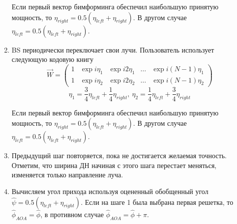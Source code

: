 \begin{enumerate}[label=\textbf{Шаг \arabic*:}]
          Если первый вектор бимформинга обеспечил наибольшую принятую мощность, то
          $\eta_{right} = 0.5 (\eta_{left} + \eta_{right})$.
          В другом случае
          $\eta_{left} = 0.5 (\eta_{left} + \eta_{right})$.
    \item BS периодически переключает свои лучи. Пользователь использует следующую кодовую книгу
          \begin{equation}
            \label{eq:4.55}
              \vec W =
              \begin{pmatrix}
                  1 & \exp{i\eta_1} & \exp{i2\eta_1} & \dots & \exp{i(N-1)\eta_1} \\
                  1 & \exp{i\eta_2} & \exp{i2\eta_2} & \dots & \exp{i(N-1)\eta_2}
              \end{pmatrix}
          \end{equation}
          \begin{equation}
              \eta_1 = \frac34 \eta_{left} + \frac14 \eta_{right}, ~ \eta_2 = \frac14 \eta_{left} + \frac34 \eta_{right}
          \end{equation}
          
          Если первый вектор бимформинга обеспечил наибольшую принятую мощность, то
          $\eta_{right} = 0.5 (\eta_{left} + \eta_{right})$.
          В другом случае
          $\eta_{left} = 0.5 (\eta_{left} + \eta_{right})$.
    \item Предыдущий шаг повторяется, пока не достигается желаемая точность. Отметим, что ширина ДН начиная с этого шага перестает меняться, изменяется только направление луча.
    \item Вычисляем угол прихода используя оцененный обобщенный угол $\hat \psi = 0.5 (\eta_{left} + \eta_{right})$. Если на шаге 1 была выбрана первая решетка, то
          $\hat \phi_{AOA} = \hat \phi$, в противном случае $\hat \phi_{AOA} = \hat \phi + \pi$.
\end{enumerate}
